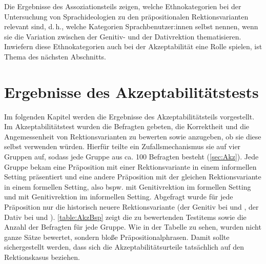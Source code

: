 Die Ergebnisse des Assoziationsteils zeigen, welche Ethnokategorien bei der Untersuchung von Sprachideologien zu den präpositionalen Rektionsvarianten relevant sind, d.\,h., welche Kategorien Sprachbenutzer:innen selbst nennen, wenn sie die Variation zwischen der Genitiv- und der Dativrektion thematisieren. 
Inwiefern diese Ethnokategorien auch bei der Akzeptabilität eine Rolle spielen, ist Thema des nächsten Abschnitts. 
\section{Ergebnisse des Akzeptabilitätstests}
\label{sec:ErgAkz}
Im folgenden Kapitel werden die Ergebnisse des Akzeptabilitätsteils vorgestellt. 
Im Akzeptabilitätstest wurden die Befragten gebeten, die Korrektheit und die Angemessenheit von Rektionsvarianten zu bewerten sowie anzugeben, ob sie diese selbst verwenden würden. 
Hierfür teilte ein Zufallsmechanismus sie auf vier Gruppen auf, sodass jede Gruppe aus ca. 100 Befragten besteht (\autoref{sec:Akz}). 
Jede Gruppe bekam eine Präposition mit einer Rektionsvariante in einem informellen Setting präsentiert und eine andere Präposition mit der gleichen Rektionsvariante in einem formellen Setting, also bspw. \dank{} mit Genitivrektion im formellen Setting und \gegenueber{} mit Genitivrektion im informellen Setting. 
Abgefragt wurde für jede Präposition nur die historisch neuere Rektionsvariante (der Genitiv bei \dank{} und \gegenueber{}, der Dativ bei \wegen{} und \waehrend{}). \autoref{table:AkzBsp} zeigt die zu bewertenden Testitems sowie die Anzahl der Befragten für jede Gruppe.
Wie in der Tabelle zu sehen, wurden nicht ganze Sätze bewertet, sondern bloße Präpositionalphrasen.
Damit sollte sichergestellt werden, dass sich die Akzeptabilitätsurteile tatsächlich auf den Rektionskasus beziehen. 

\begin{table}
\centering
{}
\caption{Beispiele und Anzahl Befragter in den Gruppen des Akzeptabilitätstests}
\label{table:AkzBsp}
\end{table}

